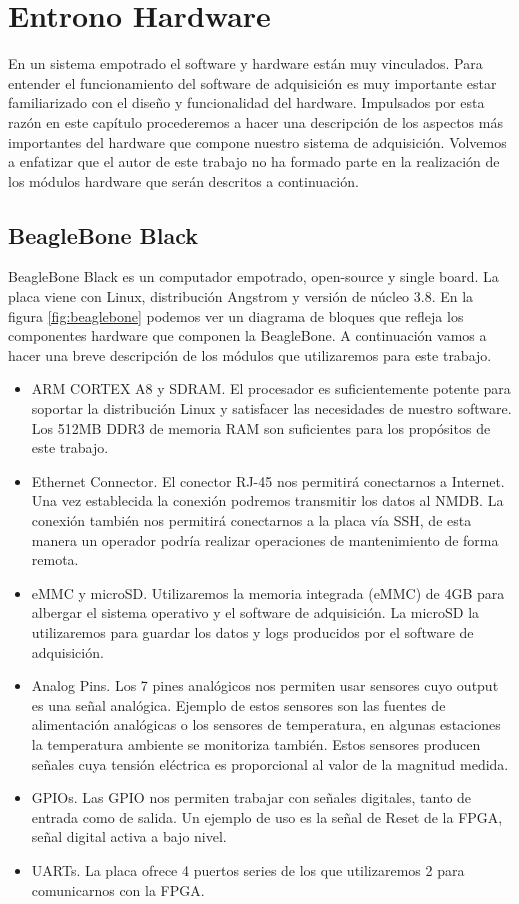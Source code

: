 \chapter{Entrono Hardware}
\label{entornoHW}

En un sistema empotrado el software y hardware están muy vinculados. Para entender el funcionamiento del software de adquisición es muy importante estar
familiarizado con el diseño y funcionalidad del hardware. Impulsados por esta razón en este capítulo procederemos a hacer una descripción de
los aspectos más importantes del hardware que compone nuestro sistema de adquisición. Volvemos a enfatizar que el autor de este trabajo no
ha formado parte  en la realización de los módulos hardware que serán descritos a continuación.
\section{BeagleBone Black}
	BeagleBone Black\cite{Beagle}\cite{BeagleWiki} es un computador empotrado, open-source y single board. La placa viene con Linux, distribución Angstrom y versión
	de núcleo 3.8. En la figura \ref{fig:beaglebone} podemos ver un diagrama de bloques que refleja los componentes hardware que componen la
	BeagleBone. A continuación vamos a hacer una breve descripción de los módulos que utilizaremos para este trabajo.
	\begin{itemize}
	  \item 	ARM CORTEX A8\cite{BeagleCore} y SDRAM. El procesador es suficientemente potente para soportar la distribución Linux y satisfacer
	    		las necesidades de nuestro software. Los 512MB DDR3 de memoria RAM son suficientes para los propósitos de este trabajo.
		\item 	Ethernet Connector. El conector RJ-45 nos permitirá conectarnos a Internet. Una vez establecida la conexión podremos transmitir
		  	los datos al NMDB. La conexión también nos permitirá conectarnos a la placa vía SSH, de esta manera un operador podría realizar
			operaciones de mantenimiento de forma remota. 
		\item	eMMC y microSD. Utilizaremos la memoria integrada (eMMC) de 4GB para albergar el sistema operativo y el software de adquisición.
		  	La microSD la utilizaremos para guardar los datos y logs producidos por el software de adquisición.
		\item 	Analog Pins. Los 7 pines analógicos nos permiten usar sensores cuyo output es una señal analógica. Ejemplo de estos sensores son
		  	las fuentes de alimentación analógicas o los sensores de temperatura, en algunas estaciones la temperatura ambiente se monitoriza
			también. Estos sensores producen señales cuya tensión eléctrica es proporcional al valor de la magnitud medida. 
		\item 	GPIOs. Las GPIO nos permiten trabajar con señales digitales, tanto de entrada como de salida. Un ejemplo de uso es la señal de
		  	Reset de la FPGA, señal digital activa a bajo nivel.
		\item	UARTs. La placa ofrece 4 puertos series de los que utilizaremos 2 para comunicarnos con la FPGA.
	\end{itemize}
